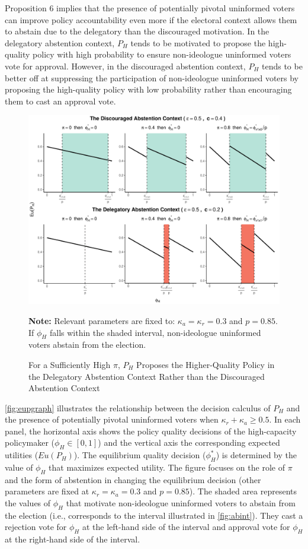 \documentclass[doc,natbib,12pt]{apa6}
\newcommand{\floatnote}[1]{\vspace{\abovecaptionskip}\caption*{\textbf{Note:} #1}\vspace{-\abovecaptionskip}}
\begin{document}
	\noindent Proposition 6 implies that the presence of potentially pivotal uninformed voters can improve policy accountability even more if the electoral context allows them to abstain due to the delegatory than the discouraged motivation. In the delegatory abstention context, $P_H$ tends to be motivated to propose the high-quality policy with high probability to ensure non-ideologue uninformed voters vote for approval. However, in the discouraged abstention context, $P_H$ tends to be better off at suppressing the participation of non-ideologue uninformed voters by proposing the high-quality policy with low probability rather than encouraging them to cast an approval vote.
	
	\begin{figure}[t!]
		\caption{For a Sufficiently High $\pi$, $P_H$ Proposes the Higher-Quality Policy in the Delegatory Abstention Context Rather than the Discouraged Abstention Context}
		\label{fig:eupgraph}
		\includegraphics[width=\linewidth]{figure/eupgraph-1}
		\floatnote{Relevant parameters are fixed to: $\kappa_a = \kappa_r = 0.3$ and $p=0.85$. If $\phi_H$ falls within the shaded interval, non-ideologue uninformed voters abstain from the election.}
	\end{figure}
	
	\par \autoref{fig:eupgraph} illustrates the relationship between the decision calculus of $P_H$ and the presence of potentially pivotal uninformed voters when $\kappa_{r}+\kappa_{a}\geq 0.5$. In each panel, the horizontal axis shows the policy quality decisions of the high-capacity policymaker ($\phi_H \in [0,1]$) and the vertical axis the corresponding expected utilities ($Eu(P_H)$). The equilibrium quality decision ($\phi^*_H$) is determined by the value of $\phi_H$ that maximizes expected utility. The figure focuses on the role of $\pi$ and the form of abstention in changing the equilibrium decision (other parameters are fixed at $\kappa_{r}=\kappa_{a}=0.3$ and $p=0.85$). The shaded area represents the values of $\phi_H$ that motivate non-ideologue uninformed voters to abstain from the election (i.e., corresponds to the interval illustrated in \autoref{fig:abint}). They cast a rejection vote for $\phi_H$ at the left-hand side of the interval and approval vote for $\phi_H$ at the right-hand side of the interval.
	
\end{document}

